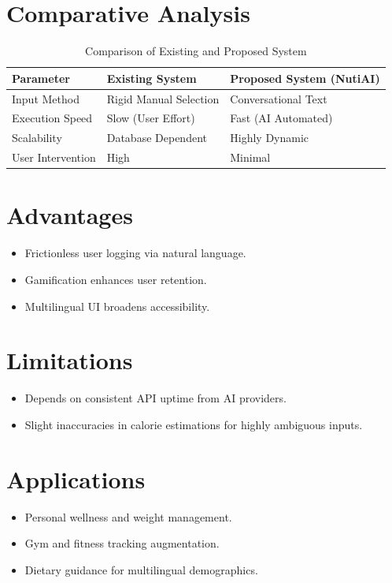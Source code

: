 \documentclass[12pt,a4paper]{report}
\begin{document}
\section{Comparative Analysis}
\begin{table}[H]
\centering
\begin{tabular}{|l|l|l|}
\hline
\textbf{Parameter} & \textbf{Existing System} & \textbf{Proposed System (NutiAI)} \\ \hline
Input Method & Rigid Manual Selection & Conversational Text \\ \hline
Execution Speed & Slow (User Effort) & Fast (AI Automated) \\ \hline
Scalability & Database Dependent & Highly Dynamic \\ \hline
User Intervention & High & Minimal \\ \hline
\end{tabular}
\caption{Comparison of Existing and Proposed System}
\end{table}

\section{Advantages}
\begin{itemize}
    \item Frictionless user logging via natural language.
    \item Gamification enhances user retention.
    \item Multilingual UI broadens accessibility.
\end{itemize}

\section{Limitations}
\begin{itemize}
    \item Depends on consistent API uptime from AI providers.
    \item Slight inaccuracies in calorie estimations for highly ambiguous inputs.
\end{itemize}

\section{Applications}
\begin{itemize}
    \item Personal wellness and weight management.
    \item Gym and fitness tracking augmentation.
    \item Dietary guidance for multilingual demographics.
\end{itemize}
\end{document}
